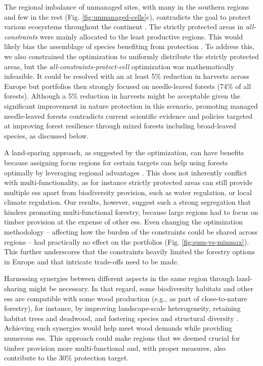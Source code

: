 \documentclass[]{article}
\begin{document}
The regional imbalance of unmanaged sites, with many in the southern regions and few in the rest (Fig. \ref{fig:unmanaged-cells}c), contradicts the goal to protect various ecosystems throughout the continent \parencite{EuropeanCommissionBiodivStrat2020}.
The strictly protected areas in \textit{all-constraints} were mainly allocated to the least productive regions. This would likely bias the assemblage of species benefiting from protection \parencite[see, e.g.,][]{Hamalainen2018}.
To address this, we also constrained the optimization to uniformly distribute the strictly protected areas, but the \textit{all-constraints-protect-cell} optimization was mathematically infeasible. It could be resolved with an at least 5\% reduction in harvests across Europe but portfolios then strongly focused on needle-leaved forests (74\% of all forests). Although a 5\% reduction in harvests might be acceptable given the significant improvement in nature protection in this scenario, promoting managed needle-leaved forests contradicts current scientific evidence and policies targeted at improving forest resilience through mixed forests including broad-leaved species, as discussed below. 


A land-sparing approach, as suggested by the optimization, can have benefits because assigning focus regions for certain targets can help using forests optimally by leveraging regional advantages \parencite{Gutsch2018, LessaDerciAugustynczik2021}.
This does not inherently conflict with multi-functionality, as for instance strictly protected areas can still provide multiple \glspl{es} apart from biodiversity provision, such as water regulation, or local climate regulation.
Our results, however, suggest such a strong segregation that hinders promoting multi-functional forestry, because large regions had to focus on timber provision at the expense of other \glspl{es}.
Even changing the optimization methodology -- affecting how the burden of the constraints could be shared across regions -- had practically no effect on the portfolios (Fig. \ref{fig:sum-vs-minmax}). This further underscores that the constraints heavily limited the forestry options in Europe and that intricate trade-offs need to be made.

Harnessing synergies between different aspects in the same region through land-sharing might be necessary.
In that regard, some biodiversity habitats and other \glspl{es} are compatible with some wood production (e.g., as part of close-to-nature forestry), for instance, by improving landscape-scale heterogeneity, retaining habitat trees and deadwood, and fostering species and structural diversity \parencite[e.g.,][]{Schall2018, Larsen2022, Biber2020, Makela2023}.
Achieving such synergies would help meet wood demands while providing numerous \glspl{es}. 
This approach could make regions that we deemed crucial for timber provision more multi-functional and, with proper measures, also contribute to the 30\% protection target.
\end{document}

